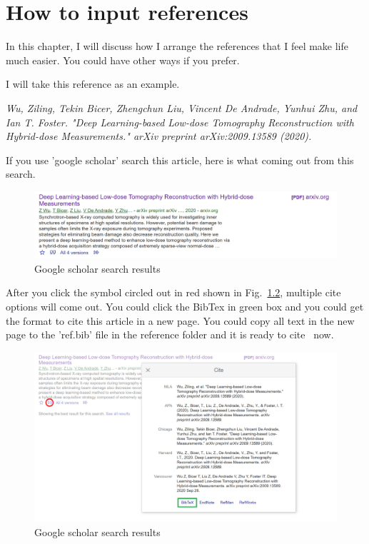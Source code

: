 \chapter{How to input references} \label{ch:ch4}

In this chapter, I will discuss how I arrange the references that I feel make life much easier. You could have other ways if you prefer. 

I will take this reference as an example. 

\textit{Wu, Ziling, Tekin Bicer, Zhengchun Liu, Vincent De Andrade, Yunhui Zhu, and Ian T. Foster. "Deep Learning-based Low-dose Tomography Reconstruction with Hybrid-dose Measurements." arXiv preprint arXiv:2009.13589 (2020).}

If you use 'google scholar' search this article, here is what coming out from this search.

\begin{figure}[h!]
\centering
\includegraphics[width = 0.85\linewidth]{./figs/ch4/reference.PNG}
\caption{Google scholar search results}
\label{fig:4-fig1}
\end{figure}

After you click the symbol circled out in red shown in Fig.~\ref{fig:4-fig2}, multiple cite options will come out. You could click the BibTex in green box and you could get the format to cite this article in a new page. You could copy all text in the new page to the 'ref.bib' file in the reference folder and it is ready to cite~\cite{wu2020deep} now. 

\begin{figure}[h!]
\centering
\includegraphics[width = 0.85\linewidth]{./figs/ch4/bibTex.png}
\caption{Google scholar search results}
\label{fig:4-fig2}
\end{figure}

